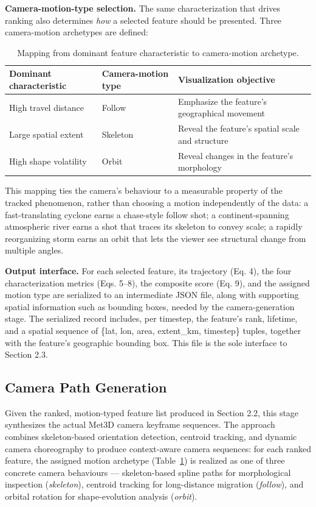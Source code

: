 \documentclass[journal abbreviation, manuscript]{copernicus}
\begin{document}
\textbf{Camera-motion-type selection.} The same characterization that drives ranking also determines \textit{how} a selected feature should be presented. Three camera-motion archetypes are defined:

\begin{table}[htbp]
\centering
\caption{Mapping from dominant feature characteristic to camera-motion archetype.}
\label{tab:camera-motion}
\begin{tabular}{lll}
\hline
\textbf{Dominant characteristic} &
\textbf{Camera-motion type} &
\textbf{Visualization objective} \\
\hline
High travel distance &
Follow &
Emphasize the feature's geographical movement \\

Large spatial extent &
Skeleton &
Reveal the feature's spatial scale and structure \\

High shape volatility &
Orbit &
Reveal changes in the feature's morphology \\
\hline
\end{tabular}
\end{table}

This mapping ties the camera's behaviour to a measurable property of the tracked phenomenon, rather than choosing a motion independently of the data: a fast-translating cyclone earns a chase-style follow shot; a continent-spanning atmospheric river earns a shot that traces its skeleton to convey scale; a rapidly reorganizing storm earns an orbit that lets the viewer see structural change from multiple angles.

\textbf{Output interface.} For each selected feature, its trajectory (Eq. 4), the four characterization metrics (Eqs. 5--8), the composite score (Eq. 9), and the assigned motion type are serialized to an intermediate JSON file, along with supporting spatial information such as bounding boxes, needed by the camera-generation stage. The serialized record includes, per timestep, the feature's rank, lifetime, and a spatial sequence of \{lat, lon, area, extent\_km, timestep\} tuples, together with the feature's geographic bounding box. This file is the sole interface to Section 2.3.


\subsection{Camera Path Generation}

Given the ranked, motion-typed feature list produced in Section 2.2, this stage synthesizes the actual Met3D camera keyframe sequences. The approach combines skeleton-based orientation detection, centroid tracking, and dynamic camera choreography to produce context-aware camera sequences: for each ranked feature, the assigned motion archetype (Table~\ref{tab:camera-motion}) is realized as one of three concrete camera behaviours --- skeleton-based spline paths for morphological inspection (\textit{skeleton}), centroid tracking for long-distance migration (\textit{follow}), and orbital rotation for shape-evolution analysis (\textit{orbit}).
\end{document}
